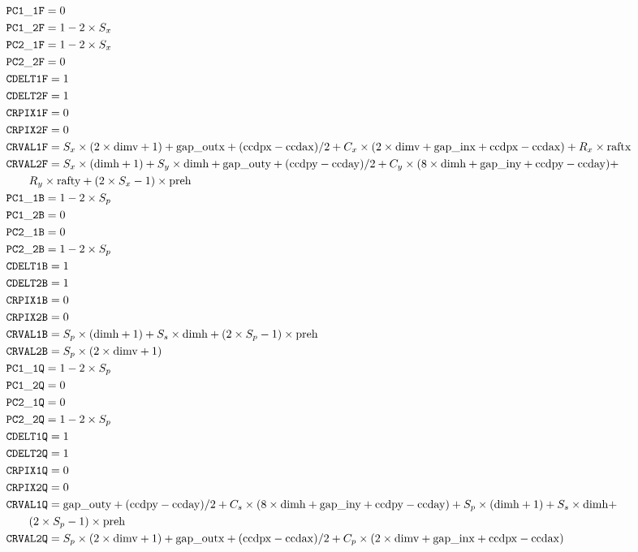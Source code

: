 \documentclass{article}[12pt]
\begin{document}
\begin{align*}
& {\tt PC1\_1F} = 0  \\
& {\tt PC1\_2F} = 1 - 2 \times S_x \\
& {\tt PC2\_1F} = 1 - 2 \times S_x \\
& {\tt PC2\_2F} = 0 \\
& {\tt CDELT1F} = 1 \\
& {\tt CDELT2F} = 1 \\
& {\tt CRPIX1F} = 0 \\
& {\tt CRPIX2F} = 0 \\
& {\tt CRVAL1F} = S_x \times (2 \times {\rm dimv} + 1) + {\rm gap\_outx} + ({\rm ccdpx} - {\rm ccdax})/2 +  C_x \times (2 \times {\rm dimv} + {\rm gap\_inx} + {\rm ccdpx} - {\rm ccdax}) +R_x \times {\rm raftx} \\
& {\tt CRVAL2F} = S_x \times ({\rm dimh} + 1) + S_y \times {\rm dimh} +  {\rm gap\_outy} + ({\rm ccdpy} -  {\rm ccday})/2 + C_y \times ( 8 \times {\rm dimh} + {\rm gap\_iny} + {\rm ccdpy} - {\rm ccday}) + \\  &\qquad {} R_y \times {\rm rafty} + (2 \times S_x - 1) \times {\rm preh}  \\
& {\tt PC1\_1B} = 1 - 2 \times S_p  \\
& {\tt PC1\_2B} = 0 \\
& {\tt PC2\_1B} = 0 \\
& {\tt PC2\_2B} = 1 - 2 \times S_p \\
& {\tt CDELT1B} = 1 \\
& {\tt CDELT2B} = 1 \\
& {\tt CRPIX1B} = 0 \\
& {\tt CRPIX2B} = 0 \\
& {\tt CRVAL1B} = S_p \times ({\rm dimh} + 1) + S_s \times {\rm dimh} + (2 \times S_p -1) \times {\rm preh} \\
& {\tt CRVAL2B} = S_p \times (2 \times {\rm dimv} + 1)  \\
& {\tt PC1\_1Q} = 1 - 2 \times S_p  \\
& {\tt PC1\_2Q} = 0 \\
& {\tt PC2\_1Q} = 0 \\
& {\tt PC2\_2Q} = 1 - 2 \times S_p  \\
& {\tt CDELT1Q} = 1 \\
& {\tt CDELT2Q} = 1 \\
& {\tt CRPIX1Q} = 0 \\
& {\tt CRPIX2Q} = 0 \\
& {\tt CRVAL1Q} = {\rm gap\_outy} + ({\rm ccdpy} - {\rm ccday})/2 + C_s \times (8 \times {\rm dimh} + {\rm gap\_iny} + {\rm ccdpy} - {\rm ccday}) + S_p \times ({\rm dimh} + 1) + S_s \times {\rm dimh} + \\ &\qquad{} (2 \times S_p -1) \times {\rm preh}  \\
& {\tt CRVAL2Q} = S_p \times (2 \times {\rm dimv} + 1) +  {\rm gap\_outx} + ({\rm ccdpx} - {\rm ccdax})/2 + C_p \times ( 2 \times {\rm dimv} + {\rm gap\_inx} + {\rm ccdpx} - {\rm ccdax}) \\
\end{align*}
\end{document}
